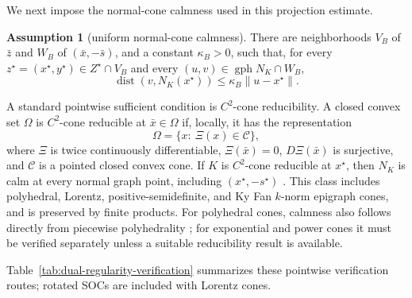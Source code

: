 \documentclass[letterpaper]{article} %
\theoremstyle{definition}
\newtheorem{assumption}[theorem]{Assumption}
\theoremstyle{remark}
\begin{document}
We next impose the normal-cone calmness used in this projection estimate.

\begin{assumption}[uniform normal-cone calmness]
\label{ass:normal-calmness}
There are neighborhoods $V_B$ of $\bar z$ and $W_B$ of
$(\bar x,-\bar s)$, and a constant $\kappa_B>0$, such that, for every
$z^\star=(x^\star,y^\star)\in Z^\star\cap V_B$ and every
$(u,v)\in\operatorname{gph}N_K\cap W_B$,
\begin{equation}
\label{eq:normal-calmness}
    \operatorname{dist}(v,N_K(x^\star))
    \le
    \kappa_B\|u-x^\star\|.
\end{equation}
\end{assumption}

A standard pointwise sufficient condition is $C^2$-cone reducibility.  A
closed convex set $\Omega$ is $C^2$-cone reducible at $\bar x\in\Omega$ if,
locally, it has the representation
\[
    \Omega=\{x:\ \Xi(x)\in\mathcal C\},
\]
where $\Xi$ is twice continuously differentiable, $\Xi(\bar x)=0$,
$D\Xi(\bar x)$ is surjective, and $\mathcal C$ is a pointed closed convex cone.
If $K$ is $C^2$-cone reducible at $x^\star$, then $N_K$ is calm at every
normal graph point, including $(x^\star,-s^\star)$
\cite[Theorem~2.1]{liu2019graphical}.  This class includes polyhedral,
Lorentz, positive-semidefinite, and Ky Fan $k$-norm epigraph cones, and is
preserved by finite products.  For polyhedral cones, calmness also follows
directly from piecewise polyhedrality
\cite{robinson1981continuity}; for exponential and power cones it must be
verified separately unless a suitable reducibility result is available.

Table~\ref{tab:dual-regularity-verification} summarizes these pointwise
verification routes; rotated SOCs are included with Lorentz cones.
\end{document}
